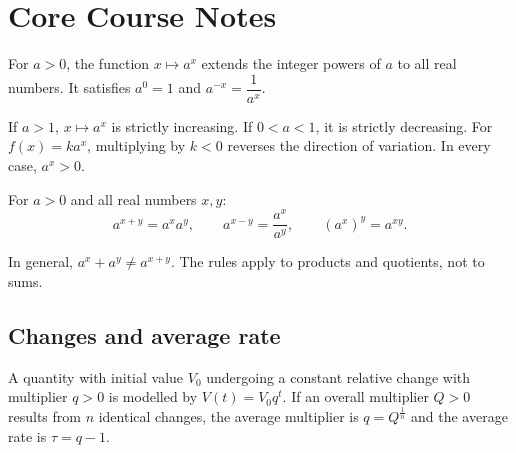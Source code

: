 
\section{Core Course Notes}
For $a>0$, the function $x\mapsto a^x$ extends the integer powers of $a$ to all real numbers. It satisfies $a^0=1$ and $a^{-x}=\dfrac{1}{a^x}$.

\begin{center}
\end{center}

\begin{keypoint}
If $a>1$, $x\mapsto a^x$ is strictly increasing. If $0<a<1$, it is strictly decreasing. For $f(x)=ka^x$, multiplying by $k<0$ reverses the direction of variation. In every case, $a^x>0$.
\end{keypoint}

For $a>0$ and all real numbers $x,y$:
\[
a^{x+y}=a^xa^y,\qquad a^{x-y}=\frac{a^x}{a^y},\qquad (a^x)^y=a^{xy}.
\]

\begin{pitfall}
In general, $a^x+a^y\neq a^{x+y}$. The rules apply to products and quotients, not to sums.
\end{pitfall}

\subsection{Changes and average rate}
A quantity with initial value $V_0$ undergoing a constant relative change with multiplier $q>0$ is modelled by $V(t)=V_0q^t$. If an overall multiplier $Q>0$ results from $n$ identical changes, the average multiplier is $q=Q^{\frac1n}$ and the average rate is $\tau=q-1$.

